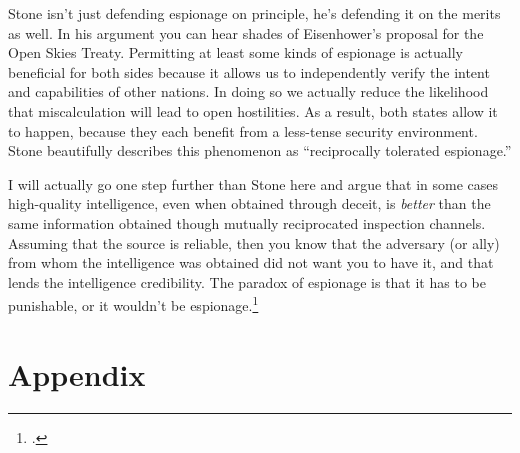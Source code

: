 \documentclass{memoir}
\begin{document}
\begin{refsegment}

Stone isn't just defending espionage on principle, he's defending it on the merits as well. In his argument you can hear shades of Eisenhower's proposal for the Open Skies Treaty. Permitting at least some kinds of espionage is actually beneficial for both sides because it allows us to independently verify the intent and capabilities of other nations. In doing so we actually reduce the likelihood that miscalculation will lead to open hostilities. As a result, both states allow it to happen, because they each benefit from a less-tense security environment. Stone beautifully describes this phenomenon as ``reciprocally tolerated espionage.''


I will actually go one step further than Stone here and argue that in some cases high-quality intelligence, even when obtained through deceit, is \emph{better} than the same information obtained though mutually reciprocated inspection channels. Assuming that the source is reliable, then you know that the adversary (or ally) from whom the intelligence was obtained did not want you to have it, and that lends the intelligence credibility. The paradox of espionage is that it has to be punishable, or it wouldn't be espionage.\footcite[p.~347]{demarest_espionage_1995}



\section{Appendix}

\end{refsegment}
\end{document}
